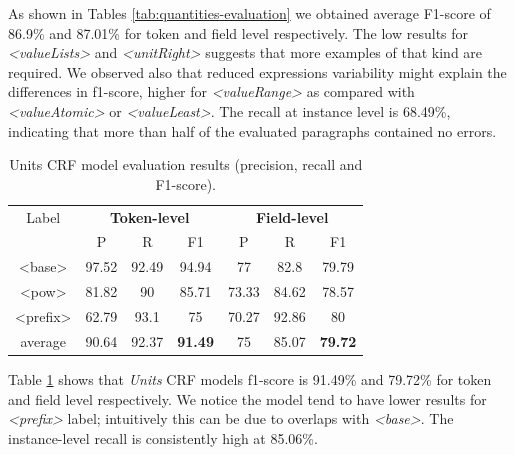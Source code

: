 \documentclass[sigconf]{acmart}
\begin{document}
As shown in Tables \ref{tab:quantities-evaluation} we obtained average F1-score of 86.9\% and 87.01\% for token and field level respectively. The low results for \textit{<valueLists>} and \textit{<unitRight>} suggests that more examples of that kind are required.  We observed also that reduced expressions variability might explain the differences in f1-score, higher for \textit{<valueRange>} as  compared with \textit{<valueAtomic>} or \textit{<valueLeast>}. The recall at instance level is 68.49\%, indicating that more than half of the evaluated paragraphs contained no errors. 

\begin{table}[ht]
    \caption{Units CRF model evaluation results (precision, recall and F1-score).}
    \label{tab:units-evaluation}
    \begin{tabular}{c|ccc|ccc}
        \toprule
        Label & \multicolumn{3}{c}{\textbf{Token-level}} & \multicolumn{3}{c}{\textbf{Field-level}}\\
        & P & R & F1 & P & R & F1 \\
        \midrule
        <base>    & 97.52 & 92.49 & 94.94 & 77    & 82.8  & 79.79 \\
        <pow>     & 81.82 & 90    & 85.71 & 73.33 & 84.62 & 78.57 \\
        <prefix>  & 62.79 & 93.1  & 75    & 70.27 & 92.86 & 80    \\
        \midrule
        average   & 90.64  & 92.37 & \textbf{91.49} & 75   & 85.07 & \textbf{79.72} \\
        \bottomrule
   \end{tabular}
\end{table}

Table \ref{tab:units-evaluation} shows that \textit{Units} CRF models f1-score is 91.49\% and 79.72\% for token and field level respectively. We notice the model tend to have lower results for \textit{<prefix>} label; intuitively this can be due to overlaps with \textit{<base>}. The instance-level recall is consistently high at 85.06\%. 
\end{document}

